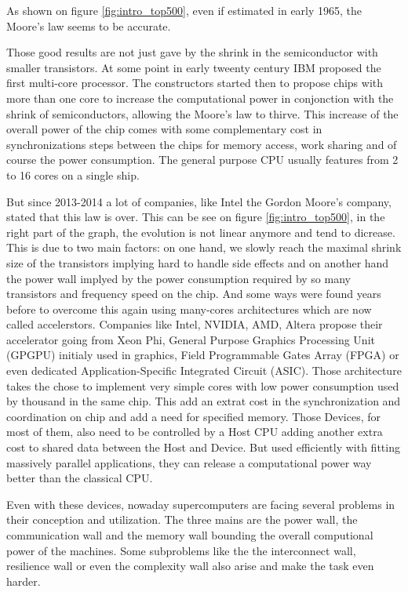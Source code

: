 As shown on figure \ref{fig:intro_top500}, even if estimated in early 1965, the Moore's law seems to be accurate. 

Those good results are not just gave by the shrink in the semiconductor with smaller transistors.
At some point in early tweenty century IBM proposed the first multi-core processor.
The constructors started then to propose chips with more than one core to increase the computational power in conjonction with the shrink of semiconductors, allowing the Moore's law to thirve. 
This increase of the overall power of the chip comes with some complementary cost in synchronizations steps between the chips for memory access, work sharing and of course the power consumption.
The general purpose CPU usually features from 2 to 16 cores on a single ship. 

But since 2013-2014 a lot of companies, like Intel the Gordon Moore's company, stated that this law is over. 
This can be see on figure \ref{fig:intro_top500}, in the right part of the graph, the evolution is not linear anymore and tend to dicrease. 
This is due to two main factors: on one hand, we slowly reach the maximal shrink size of the transistors implying hard to handle side effects and on another hand the power wall implyed by the power consumption required by so many transistors and frequency speed on the chip.
And some ways were found years before to overcome this again using many-cores architectures which are now called accelerstors. 
Companies like Intel, NVIDIA, AMD, Altera propose their accelerator going from Xeon Phi, General Purpose Graphics Processing Unit (GPGPU) initialy used in graphics, Field Programmable Gates Array (FPGA) or even dedicated Application-Specific Integrated Circuit (ASIC).
Those architecture takes the chose to implement very simple cores with low power consumption used by thousand in the same chip. 
This add an extrat cost in the synchronization and coordination on chip and add a need for specified memory. 
Those Devices, for most of them, also need to be controlled by a Host CPU adding another extra cost to shared data between the Host and Device. 
But used efficiently with fitting massively parallel applications, they can release a computational power way better than the classical CPU. 

Even with these devices, nowaday supercomputers are facing several problems in their conception and utilization. 
The three mains are the power wall, the communication wall and the memory wall bounding the overall computional power of the machines.  
Some subproblems like the the interconnect wall, resilience wall or even the complexity wall also arise and make the task even harder.\\


